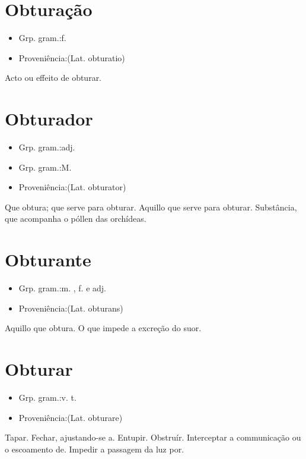 \section{Obturação}
\begin{itemize}
\item {Grp. gram.:f.}
\end{itemize}
\begin{itemize}
\item {Proveniência:(Lat. \textunderscore obturatio\textunderscore )}
\end{itemize}
Acto ou effeito de obturar.
\section{Obturador}
\begin{itemize}
\item {Grp. gram.:adj.}
\end{itemize}
\begin{itemize}
\item {Grp. gram.:M.}
\end{itemize}
\begin{itemize}
\item {Proveniência:(Lat. \textunderscore obturator\textunderscore )}
\end{itemize}
Que obtura; que serve para obturar.
Aquillo que serve para obturar.
Substância, que acompanha o póllen das orchídeas.
\section{Obturante}
\begin{itemize}
\item {Grp. gram.:m. ,  f.  e  adj.}
\end{itemize}
\begin{itemize}
\item {Proveniência:(Lat. \textunderscore obturans\textunderscore )}
\end{itemize}
Aquillo que obtura.
O que impede a excreção do suor.
\section{Obturar}
\begin{itemize}
\item {Grp. gram.:v. t.}
\end{itemize}
\begin{itemize}
\item {Proveniência:(Lat. \textunderscore obturare\textunderscore )}
\end{itemize}
Tapar.
Fechar, ajustando-se a.
Entupir.
Obstruír.
Interceptar a communicação ou o escoamento de.
Impedir a passagem da luz por.
